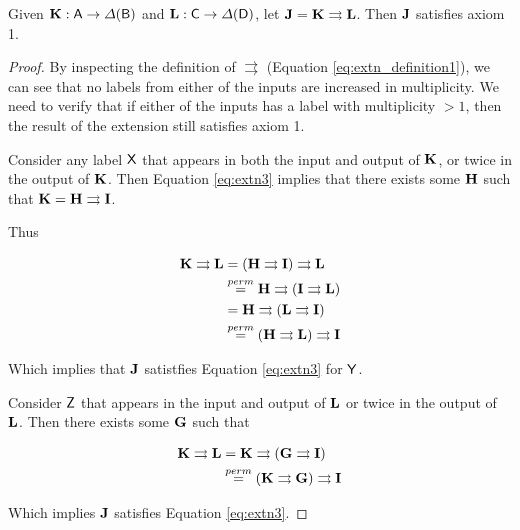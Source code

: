 \begin{theorem}
Given $\mathbf{K}:\mathsf{A}\to\Delta(\mathsf{B})$ and $\mathbf{L}:\mathsf{C}\to\Delta(\mathsf{D})$, let $\mathbf{J}=\mathbf{K}\rightrightarrows \mathbf{L}$. Then $\mathbf{J}$ satisfies axiom 1.
\end{theorem}

\begin{proof}
By inspecting the definition of $\rightrightarrows$ (Equation \ref{eq:extn_definition1}), we can see that no labels from either of the inputs are increased in multiplicity. We need to verify that if either of the inputs has a label with multiplicity $>1$, then the result of the extension still satisfies axiom 1. 

Consider any label $\mathsf{X}$ that appears in both the input and output of $\mathbf{K}$, or twice in the output of $\mathbf{K}$. Then Equation \ref{eq:extn3} implies that there exists some $\mathbf{H}$ such that $\mathbf{K}=\mathbf{H}\rightrightarrows\mathbf{I}$.

Thus

\begin{align}
	\mathbf{K}\rightrightarrows \mathbf{L} &= (\mathbf{H}\rightrightarrows \mathbf{I})\rightrightarrows\mathbf{L}\\
										   &\overset{perm}{=} \mathbf{H}\rightrightarrows(\mathbf{I}\rightrightarrows\mathbf{L})\\
										   &= \mathbf{H}\rightrightarrows(\mathbf{L}\rightrightarrows\mathbf{I})\\
										   &\overset{perm}{=} (\mathbf{H}\rightrightarrows\mathbf{L})\rightrightarrows\mathbf{I}
\end{align}

Which implies that $\mathbf{J}$ satistfies Equation \ref{eq:extn3} for $\mathsf{Y}$.

Consider $\mathsf{Z}$ that appears in the input and output of $\mathbf{L}$ or twice in the output of $\mathbf{L}$. Then there exists some $\mathbf{G}$ such that

\begin{align}
	\mathbf{K}\rightrightarrows \mathbf{L} &= \mathbf{K}\rightrightarrows (\mathbf{G}\rightrightarrows\mathbf{I})\\
										   &\overset{perm}{=} (\mathbf{K}\rightrightarrows \mathbf{G})\rightrightarrows\mathbf{I}
\end{align}

Which implies $\mathbf{J}$ satisfies Equation \ref{eq:extn3}.
\end{proof}

